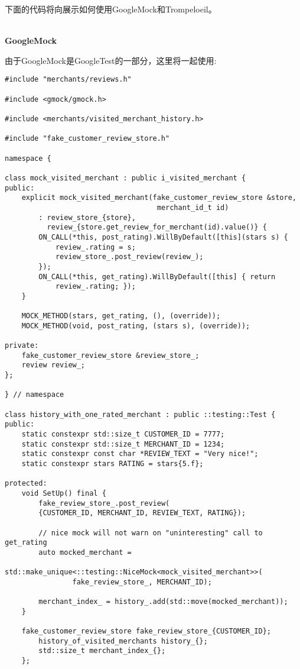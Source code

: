 下面的代码将向展示如何使用GoogleMock和Trompeloeil。

\hspace*{\fill} \\ %
\noindent
\textbf{GoogleMock}

由于GoogleMock是GoogleTest的一部分，这里将一起使用:

\begin{lstlisting}[style=styleCXX]
#include "merchants/reviews.h"

#include <gmock/gmock.h>

#include <merchants/visited_merchant_history.h>

#include "fake_customer_review_store.h"

namespace {
	
class mock_visited_merchant : public i_visited_merchant {
public:
	explicit mock_visited_merchant(fake_customer_review_store &store,
									merchant_id_t id)
		: review_store_{store},
		  review_{store.get_review_for_merchant(id).value()} {
		ON_CALL(*this, post_rating).WillByDefault([this](stars s) {
			review_.rating = s;
			review_store_.post_review(review_);
		});
		ON_CALL(*this, get_rating).WillByDefault([this] { return
			review_.rating; });
	}

	MOCK_METHOD(stars, get_rating, (), (override));
	MOCK_METHOD(void, post_rating, (stars s), (override));

private:
	fake_customer_review_store &review_store_;
	review review_;
};

} // namespace

class history_with_one_rated_merchant : public ::testing::Test {
public:
	static constexpr std::size_t CUSTOMER_ID = 7777;
	static constexpr std::size_t MERCHANT_ID = 1234;
	static constexpr const char *REVIEW_TEXT = "Very nice!";
	static constexpr stars RATING = stars{5.f};
	
protected:
	void SetUp() final {
		fake_review_store_.post_review(
		{CUSTOMER_ID, MERCHANT_ID, REVIEW_TEXT, RATING});
		
		// nice mock will not warn on "uninteresting" call to get_rating
		auto mocked_merchant =
			std::make_unique<::testing::NiceMock<mock_visited_merchant>>(
				fake_review_store_, MERCHANT_ID);
				
		merchant_index_ = history_.add(std::move(mocked_merchant));
	}

	fake_customer_review_store fake_review_store_{CUSTOMER_ID};
		history_of_visited_merchants history_{};
		std::size_t merchant_index_{};
	};


\end{lstlisting}
